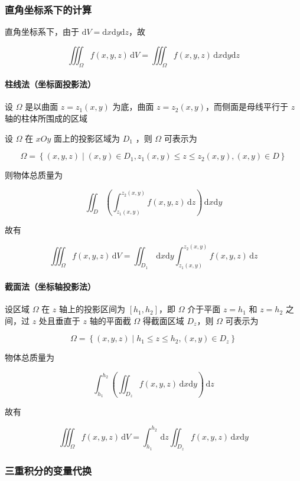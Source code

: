 \documentclass[lang = zh , final , oneside , openany , titlepage , zihao = -4 , linespread = 1.3 , baselineskip = false , cjk-font = windows , text-font = newtx , math-font = newtx]{sjtureport}
\begin{document}
\subsubsection{直角坐标系下的计算}

直角坐标系下，由于 \(\mathrm{d}V = \mathrm{d}x\mathrm{d}y\mathrm{d}z\)，故

\[
\iiint_\Omega f(x,y,z)\,\mathrm{d}V = \iiint_\Omega f(x,y,z)\,\mathrm{d}x\mathrm{d}y\mathrm{d}z
\]

\paragraph{柱线法（坐标面投影法）}

设 \(\Omega\) 是以曲面 \(z = z_1(x,y)\) 为底，曲面 \(z = z_2(x,y)\)，而侧面是母线平行于 \(z\) 轴的柱体所围成的区域

设 \(\Omega\) 在 \(xOy\) 面上的投影区域为 \(D_1\) ，则 \(\Omega\) 可表示为

\[
\Omega = \left\{(x,y,z)\mid (x,y)\in D_1, z_1(x,y)\leq z\leq z_2(x,y),(x,y)\in D\right\}
\]

则物体总质量为

\[
\iint_D\left(\int_{z_1(x,y)}^{z_2(x,y)}f(x,y,z)\,\mathrm{d}z\right) \,\mathrm{d}x\mathrm{d}y
\]

故有

\[
\iiint_\Omega f(x,y,z)\,\mathrm{d}V = \iint_{D_1} \,\mathrm{d}x\mathrm{d}y\int_{z_1(x,y)}^{z_2(x,y)} f(x,y,z)\,\mathrm{d}z
\]

\paragraph{截面法（坐标轴投影法）}

设区域 \(\Omega\) 在 \(z\) 轴上的投影区间为 \([h_1,h_2]\)，即 \(\Omega\) 介于平面 \(z = h_1\) 和 \(z = h_2\) 之间，过 \(z\) 处且垂直于 \(z\) 轴的平面截 \(\Omega\) 得截面区域 \(D_z\)，则 \(\Omega\) 可表示为

\[
\Omega = \left\{(x,y,z)\mid h_1\leq z\leq h_2, (x,y)\in D_z\right\}
\]

物体总质量为

\[
\int_{h_1}^{h_2}\left(\iint_{D_z} f(x,y,z)\,\mathrm{d}x\mathrm{d}y\right) \,\mathrm{d}z
\]

故有

\[
\iiint_\Omega f(x,y,z)\,\mathrm{d}V = \int_{h_1}^{h_2}\,\mathrm{d}z\iint_{D_z} f(x,y,z)\,\mathrm{d}x\mathrm{d}y
\]

\subsubsection{三重积分的变量代换}
\end{document}
